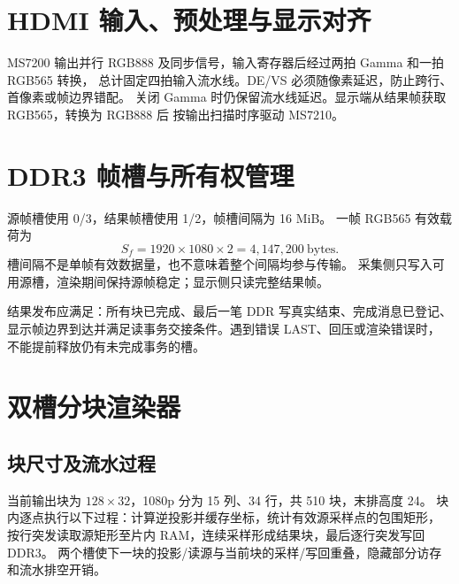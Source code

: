 \section{HDMI 输入、预处理与显示对齐}
MS7200 输出并行 RGB888 及同步信号，输入寄存器后经过两拍 Gamma 和一拍 RGB565 转换，
总计固定四拍输入流水线。DE/VS 必须随像素延迟，防止跨行、首像素或帧边界错配。
关闭 Gamma 时仍保留流水线延迟。显示端从结果帧获取 RGB565，转换为 RGB888 后
按输出扫描时序驱动 MS7210。

\section{DDR3 帧槽与所有权管理}
源帧槽使用 0/3，结果帧槽使用 1/2，帧槽间隔为 16 MiB。
一帧 RGB565 有效载荷为
\begin{equation}
S_f=1920\times1080\times2=4,147,200\ \text{bytes}.
\end{equation}
槽间隔不是单帧有效数据量，也不意味着整个间隔均参与传输。
采集侧只写入可用源槽，渲染期间保持源帧稳定；显示侧只读完整结果帧。

结果发布应满足：所有块已完成、最后一笔 DDR 写真实结束、完成消息已登记、
显示帧边界到达并满足读事务交接条件。遇到错误 LAST、回压或渲染错误时，
不能提前释放仍有未完成事务的槽。

\section{双槽分块渲染器}
\subsection{块尺寸及流水过程}
当前输出块为 $128\times32$，1080p 分为 15 列、34 行，共 510 块，末排高度 24。
块内逐点执行以下过程：计算逆投影并缓存坐标，统计有效源采样点的包围矩形，
按行突发读取源矩形至片内 RAM，连续采样形成结果块，最后逐行突发写回 DDR3。
两个槽使下一块的投影/读源与当前块的采样/写回重叠，隐藏部分访存和流水排空开销。

